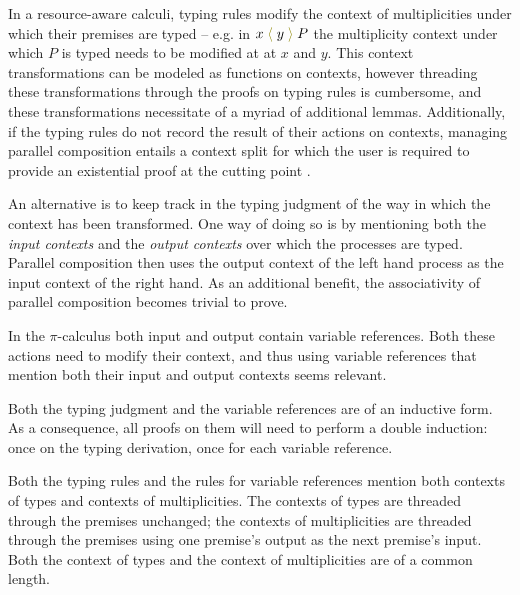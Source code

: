 \documentclass[a4paper,UKenglish,cleveref, autoref, thm-restate,authorcolumns]{lipics-v2019}
\theoremstyle{definition}
\newcommand{\picalc}{$\pi$-calculus}
\newcommand{\constr}[1]{\textcolor{olive}{\operatorname{#1}}}
\newcommand{\send}[2]{#1 \; \constr{\langle} \; #2 \;\constr{\rangle} \;}
\begin{document}

In a resource-aware calculi, typing rules modify the context of multiplicities under which their premises are typed -- e.g. in $\send{x}{y}P$ the multiplicity context under which $P$ is typed needs to be modified at at $x$ and $y$.
This context transformations can be modeled as functions on contexts, however threading these transformations through the proofs on typing rules is cumbersome, and these transformations necessitate of a myriad of additional lemmas.
Additionally, if the typing rules do not record the result of their actions on contexts, managing parallel composition entails a context split for which the user is required to provide an existential proof at the cutting point .

An alternative is to keep track in the typing judgment of the way in which the context has been transformed.
One way of doing so is by mentioning both the \emph{input contexts} and the \emph{output contexts} over which the processes are typed.
Parallel composition then uses the output context of the left hand process as the input context of the right hand.
As an additional benefit, the associativity of parallel composition becomes trivial to prove.

In the \picalc{} both input and output contain variable references.
Both these actions need to modify their context, and thus using variable references that mention both their input and output contexts seems relevant.

Both the typing judgment and the variable references are of an inductive form.
As a consequence, all proofs on them will need to perform a double induction: once on the typing derivation, once for each variable reference.

Both the typing rules and the rules for variable references mention both contexts of types and contexts of multiplicities.
The contexts of types are threaded through the premises unchanged; the contexts of multiplicities are threaded through the premises using one premise's output as the next premise's input.
Both the context of types and the context of multiplicities are of a common length.
\end{document}
